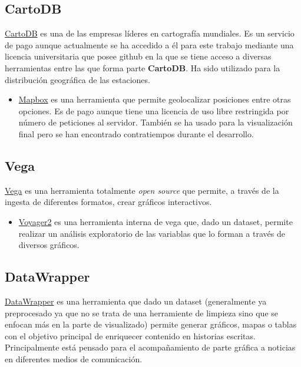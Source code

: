 \subsection{CartoDB}
\href{https://carto.com}{CartoDB} es una de las empresas líderes en cartografía mundiales. Es un servicio de pago aunque actualmente se ha accedido a él para este trabajo mediante una licencia universitaria que posee github en la que se tiene acceso a diversas herramientas entre las que forma parte \textbf{CartoDB}. Ha sido utilizado para la distribución geográfica de las estaciones.

\begin{itemize}
		\item \href{https://www.mapbox.com/}{Mapbox}  es una herramienta que permite geolocalizar posiciones entre otras opciones. Es de pago aunque tiene una licencia de uso libre restringida por número de peticiones al servidor. También se ha usado para la visualización final pero se han encontrado contratiempos durante el desarrollo.
\end{itemize}

\subsection{Vega}
\href{http://vega.github.io/}{Vega} es una herramienta totalmente \textit{open source} que permite, a través de la ingesta de diferentes formatos, crear gráficos interactivos. 

\begin{itemize}
		\item \href{http://vega.github.io/}{Voyager2} es una herramienta interna de vega que, dado un dataset, permite realizar un análisis exploratorio de las variablas que lo forman a través de diversos gráficos.
\end{itemize}

\subsection{DataWrapper}
\href{https://www.datawrapper.de}{DataWrapper} es una herramienta que dado un dataset (generalmente ya preprocesado ya que no se trata de una herramiente de limpieza sino que se enfocan más en la parte de visualizado) permite generar gráficos, mapas o tablas con el objetivo principal de enriquecer contenido en historias escritas. Principalmente está pensado para el acompañamiento de parte gráfica a noticias en diferentes medios de comunicación.



